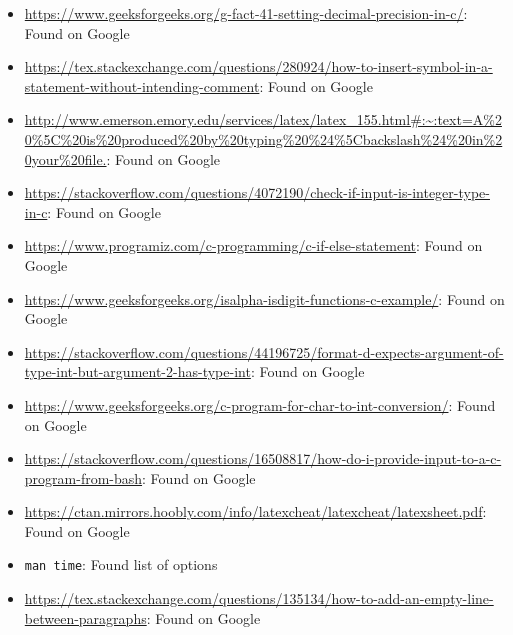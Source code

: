 \documentclass{article}
\begin{document}
\begin{flushleft}
\begin{itemize}
    \item{\url{https://www.geeksforgeeks.org/g-fact-41-setting-decimal-precision-in-c/}: Found on Google}
    \item{\url{https://tex.stackexchange.com/questions/280924/how-to-insert-symbol-in-a-statement-without-intending-comment}: Found on Google}
    \item{\url{http://www.emerson.emory.edu/services/latex/latex_155.html#:~:text=A%20%5C%20is%20produced%20by%20typing%20%24%5Cbackslash%24%20in%20your%20file.}: Found on Google}
    \item{\url{https://stackoverflow.com/questions/4072190/check-if-input-is-integer-type-in-c}: Found on Google}
    \item{\url{https://www.programiz.com/c-programming/c-if-else-statement}: Found on Google}
    \item{\url{https://www.geeksforgeeks.org/isalpha-isdigit-functions-c-example/}: Found on Google}
    \item{\url{https://stackoverflow.com/questions/44196725/format-d-expects-argument-of-type-int-but-argument-2-has-type-int}: Found on Google}
    \item{\url{https://www.geeksforgeeks.org/c-program-for-char-to-int-conversion/}: Found on Google}
    \item{\url{https://stackoverflow.com/questions/16508817/how-do-i-provide-input-to-a-c-program-from-bash}: Found on Google}
    \item{\url{https://ctan.mirrors.hoobly.com/info/latexcheat/latexcheat/latexsheet.pdf}: Found on Google}      
    \item{\texttt{man time}: Found list of options}
    \item{\url{https://tex.stackexchange.com/questions/135134/how-to-add-an-empty-line-between-paragraphs}: Found on Google}      
\end{itemize}
\end{flushleft}
\end{document}

